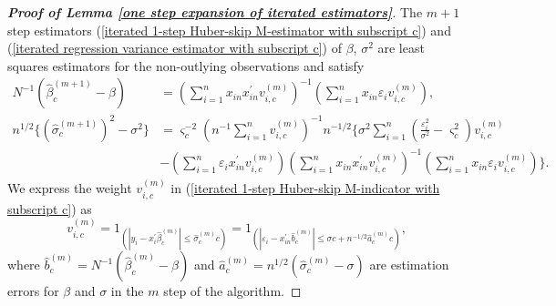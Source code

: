 \documentclass[11pt, letterpaper]{article}
\numberwithin{algorithm}{section}
\numberwithin{assumption}{section}
\numberwithin{lemma}{section}
\numberwithin{theorem}{section}
\numberwithin{corollary}{section}
\numberwithin{remark}{section}
\numberwithin{equation}{section}
\numberwithin{figure}{section}
\numberwithin{table}{section}
\begin{document}
\begin{proof}[\textnormal{\textbf{Proof of Lemma \ref{one step expansion of iterated estimators}}}]
The $m+1$ step estimators (\ref{iterated 1-step Huber-skip M-estimator with subscript c}) and (\ref{iterated regression variance estimator with subscript c}) of $\beta$, $\sigma^{2}$ are least squares estimators for the non-outlying observations and satisfy
\begin{align}
    N^{-1} (\widehat{\beta}_{c}^{(m+1)} - \beta)
    & =
    (\sum_{i=1}^{n} x_{in}x_{in}^{\prime} v_{i, c}^{(m)})^{-1}
    (\sum_{i=1}^{n} x_{in}\varepsilon_{i}  v_{i, c}^{(m)}),
    \label{expression for beta in the m+1 step after manipulations}
\\
    n^{1/2} \{ (\widehat{\sigma}_{c}^{(m+1)})^{2} - \sigma^{2} \}
    & =
    \varsigma_{c}^{-2} (n^{-1} \sum_{i=1}^{n} v_{i, c}^{(m)})^{-1}
    n^{-1/2}
    \{
    \sigma^{2} \sum_{i=1}^{n} (\frac{\varepsilon_{i}^{2}}{\sigma^{2}} - \varsigma_{c}^{2}) v_{i, c}^{(m)}
    \label{expression for sigma in the m+1 step after manipulations}
\\
    &
    -
    (\sum_{i=1}^{n} \varepsilon_{i} x_{in}^{\prime} v_{i, c}^{(m)})
    (
    \sum_{i=1}^{n} x_{in} x_{in}^{\prime} v_{i, c}^{(m)}
    )^{-1}
    (\sum_{i=1}^{n} x_{in} \varepsilon_{i} v_{i, c}^{(m)})
    \}.
    \nonumber
\end{align}
We express the weight $v_{i, c}^{(m)}$ in (\ref{iterated 1-step Huber-skip M-indicator with subscript c}) as
\begin{equation} \label{expression for the weight indicators}
v_{i, c}^{(m)} = 1_{(|y_{i} - x_{i}^{\prime} \widehat{\beta}_{c}^{(m)}| \le \widehat{\sigma}_{c}^{(m)} c)} = 1_{(|\varepsilon_{i} - x_{in}^{\prime}\widehat{b}_{c}^{(m)}| \le \sigma c + n^{-1/2} \widehat{a}_{c}^{(m)}c)}, %
\end{equation}
where $\widehat{b}_{c}^{(m)} = N^{-1} (\widehat{\beta}_{c}^{(m)} - \beta)$ and $\widehat{a}_{c}^{(m)} = n^{1/2} (\widehat{\sigma}_{c}^{(m)} - \sigma)$ are estimation errors for $\beta$ and $\sigma$ in the $m$ step of the algorithm.


\end{proof}
\end{document}
